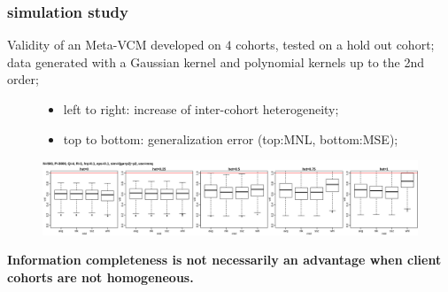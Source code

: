 \documentclass{beamer}
\begin{document}
\begin{frame}\frametitle{simulation study}
  Validity of an Meta-VCM developed on $4$ cohorts, tested on a hold
  out cohort; data generated with a Gaussian kernel and polynomial
  kernels up to
  the 2nd order; \\
  \begin{figure}
    \raggedright  \scriptsize
    \begin{itemize}
    \item left to right: increase of inter-cohort heterogeneity;\\
    \item top to bottom: generalization error (top:MNL, bottom:MSE);
    \end{itemize}
    \normalsize
    \includegraphics[width=\linewidth]{km2_mnq_s01.png}
  \end{figure}
  \textbf{Information completeness is not necessarily an advantage when
  client cohorts are not homogeneous.}
\end{frame}
\end{document}
